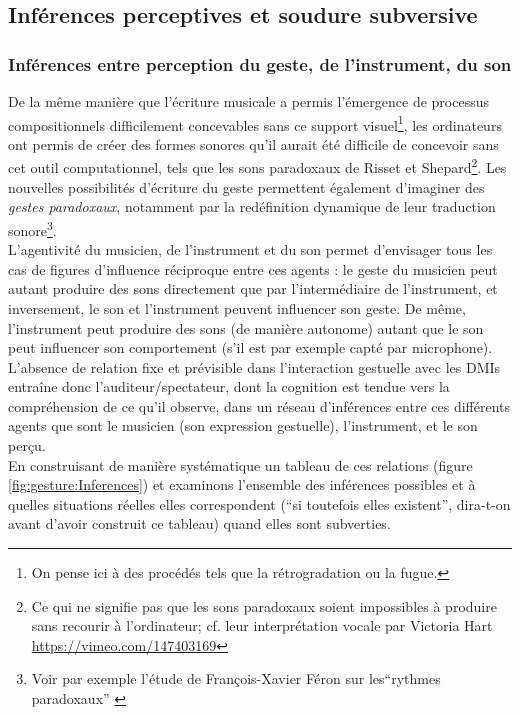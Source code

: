 \subsection{Inférences perceptives et soudure subversive}
\label{sec:gesture:inferences-soudure}

\subsubsection{Inférences entre perception du geste, de l'instrument, du son}
\label{sec:gesture:inferences-soudure:inferences}

\noindent De la même manière que l'écriture musicale a permis l'émergence de processus compositionnels difficilement concevables sans ce support visuel\footnote{On pense ici à des procédés tels que la rétrogradation ou la fugue.}, les ordinateurs ont permis de créer des formes sonores qu'il aurait été difficile de concevoir sans cet outil computationnel, tels que les sons paradoxaux de Risset et Shepard\footnote{Ce qui ne signifie pas que les sons paradoxaux soient impossibles à produire sans recourir à l'ordinateur; cf. leur interprétation vocale par Victoria Hart \url{https://vimeo.com/147403169}}. Les nouvelles possibilités d'écriture du geste permettent également d'imaginer des \textit{gestes paradoxaux}, notamment par la redéfinition dynamique de leur traduction sonore\footnote{Voir par exemple l'étude de François-Xavier Féron sur les``rythmes paradoxaux'' \cite{feron_lart_2010}}.\\
\indent L'agentivité du musicien, de l'instrument et du son permet d'envisager tous les cas de figures d'influence réciproque entre ces agents : le geste du musicien peut autant produire des sons directement que par l'intermédiaire de l'instrument, et inversement, le son et l'instrument peuvent influencer son geste. De même, l'instrument peut produire des sons (de manière autonome) autant que le son peut influencer son comportement (s'il est par exemple capté par microphone). L'absence de relation fixe et prévisible dans l'interaction gestuelle avec les \glspl{DMI} entraîne donc l'auditeur/spectateur, dont la cognition est tendue vers la compréhension de ce qu'il observe, dans un réseau d'inférences entre ces différents agents que sont le musicien (son expression gestuelle), l'instrument, et le son perçu.\\
\indent En construisant de manière systématique un tableau de ces relations (figure \ref{fig:gesture:Inferences}) et examinons l'ensemble des inférences possibles et à quelles situations réelles elles correspondent (``si toutefois elles existent'', dira-t-on avant d'avoir construit ce tableau) quand elles sont subverties.
